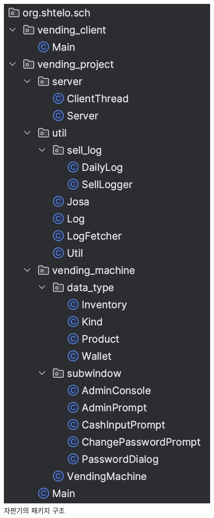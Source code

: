 \documentclass{oblivoir}
\begin{document}
    \begin{figure}[h]
        \centering
        \includegraphics[height=0.5\textheight]{images/class-tree}
        \caption{자판기의 패키지 구조}
        \label{fig:uml}
    \end{figure}
\end{document}
